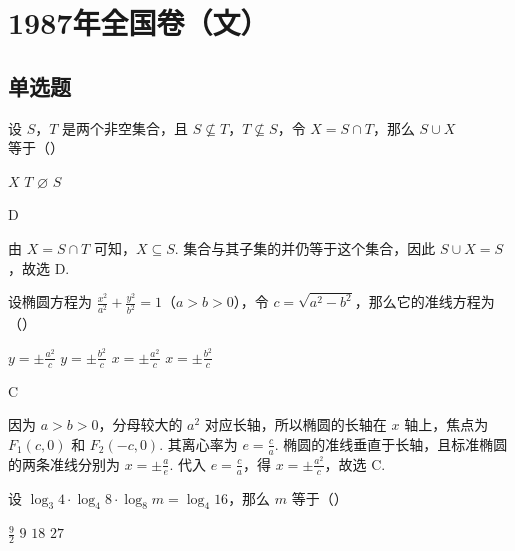 \chapter{1987年全国卷（文）}

\section{单选题}

\begin{problem}
设 \(S\)，\(T\) 是两个非空集合，且 \(S \not\subseteq T\)，\(T \not\subseteq S\)，令 \(X = S \cap T\)，那么 \(S \cup X\) 等于（\quad）

\choices
    {\(X\)}
    {\(T\)}
    {\(\varnothing\)}
    {\(S\)}
\end{problem}

\begin{answer}
D
\end{answer}

\begin{solution}
由 \(X=S\cap T\) 可知，\(X\subseteq S\). 集合与其子集的并仍等于这个集合，因此 \(S\cup X=S\)，故选 D.
\end{solution}

\begin{problem}
设椭圆方程为 \(\frac{x^2}{a^2} + \frac{y^2}{b^2} = 1\)（\(a > b > 0\)），令 \(c = \sqrt{a^2 - b^2}\)，那么它的准线方程为（\quad）

\choices
    {\(y = \pm \frac{a^2}{c}\)}
    {\(y = \pm \frac{b^2}{c}\)}
    {\(x = \pm \frac{a^2}{c}\)}
    {\(x = \pm \frac{b^2}{c}\)}
\end{problem}

\begin{answer}
C
\end{answer}

\begin{solution}
因为 \(a>b>0\)，分母较大的 \(a^2\) 对应长轴，所以椭圆的长轴在 \(x\) 轴上，焦点为 \(F_1(c,0)\) 和 \(F_2(-c,0)\). 其离心率为 \(e=\frac ca\). 椭圆的准线垂直于长轴，且标准椭圆的两条准线分别为 \(x=\pm\frac ae\). 代入 \(e=\frac ca\)，得 \(x=\pm\frac{a^2}{c}\)，故选 C.
\end{solution}

\begin{problem}
设 \(\log_3 4 \cdot \log_4 8 \cdot \log_8 m = \log_4 16\)，那么 \(m\) 等于（\quad）

\choices
    {\(\frac{9}{2}\)}
    {\(9\)}
    {\(18\)}
    {\(27\)}
\end{problem}

